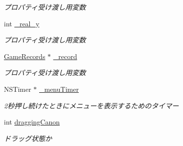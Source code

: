 \begin{DoxyCompactItemize}
\begin{DoxyCompactList}\small\item\em プロパティ受け渡し用変数 \end{DoxyCompactList}\item 
\hypertarget{interface_go_stone_view_abf783b7d70ff16d59e32b718373bf5aa}{
int \hyperlink{interface_go_stone_view_abf783b7d70ff16d59e32b718373bf5aa}{\_\-real\_\-y}}
\label{interface_go_stone_view_abf783b7d70ff16d59e32b718373bf5aa}

\begin{DoxyCompactList}\small\item\em プロパティ受け渡し用変数 \end{DoxyCompactList}\item 
\hypertarget{interface_go_stone_view_a425cbd0bcf8a00e01849148fcf6e254d}{
\hyperlink{interface_game_records}{GameRecords} $\ast$ \hyperlink{interface_go_stone_view_a425cbd0bcf8a00e01849148fcf6e254d}{\_\-record}}
\label{interface_go_stone_view_a425cbd0bcf8a00e01849148fcf6e254d}

\begin{DoxyCompactList}\small\item\em プロパティ受け渡し用変数 \end{DoxyCompactList}\item 
\hypertarget{interface_go_stone_view_a5c8cf9877770f6eda6517ab6671a389e}{
NSTimer $\ast$ \hyperlink{interface_go_stone_view_a5c8cf9877770f6eda6517ab6671a389e}{\_\-menuTimer}}
\label{interface_go_stone_view_a5c8cf9877770f6eda6517ab6671a389e}

\begin{DoxyCompactList}\small\item\em 2秒押し続けたときにメニューを表示するためのタイマー \end{DoxyCompactList}\item 
\hypertarget{interface_go_stone_view_a102059b4e2bc84deb1991ab118e8c143}{
int \hyperlink{interface_go_stone_view_a102059b4e2bc84deb1991ab118e8c143}{draggingCanon}}
\label{interface_go_stone_view_a102059b4e2bc84deb1991ab118e8c143}

\begin{DoxyCompactList}\small\item\em ドラッグ状態か \end{DoxyCompactList}\end{DoxyCompactItemize}
